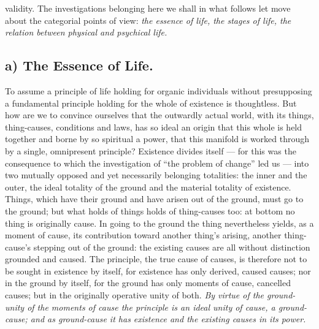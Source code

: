 \documentclass[12pt,a4paper]{book}
\begin{document}
validity. The investigations belonging here we shall in what follows let move
about the categorial points of view: \emph{the essence of life, the stages of
life, the relation between physical and psychical life.}

\subsection*{a) The Essence of Life.}

To assume a principle of life holding for organic individuals without
presupposing a fundamental principle holding for the whole of existence is
thoughtless. But how are we to convince ourselves that the outwardly actual
world, with its things, thing-causes, conditions and laws, has so ideal an
origin that this whole is held together and borne by so spiritual a power, that
this manifold is worked through by a single, omnipresent principle? Existence
divides itself --- for this was the consequence to which the investigation of
``the problem of change'' led us --- into two mutually opposed and yet
necessarily belonging totalities: the inner and the outer, the ideal totality
of the ground and the material totality of existence. Things, which have their
ground and have arisen out of the ground, must go to the ground; but what holds
of things holds of thing-causes too: at bottom no thing is originally cause. In
going to the ground the thing nevertheless yields, as a moment of cause, its
contribution toward another thing's arising, another thing-cause's stepping out
of the ground: the existing causes are all without distinction grounded and
caused. The principle, the true cause of causes, is therefore not to be sought
in existence by itself, for existence has only derived, caused causes; nor in
the ground by itself, for the ground has only moments of cause, cancelled
causes; but in the originally operative unity of both. \emph{By virtue of the
ground-unity of the moments of cause the principle is an ideal unity of cause,
a ground-cause; and as ground-cause it has existence and the existing causes in
its power.}
\end{document}
